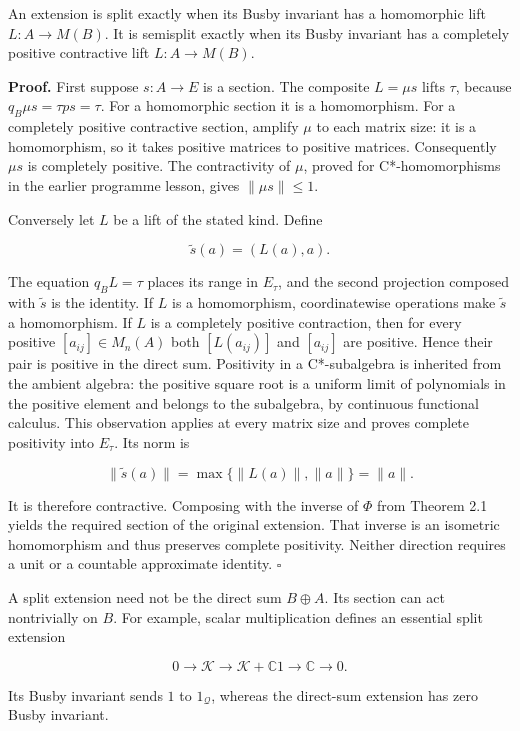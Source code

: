 \documentclass[
  11pt,
]{article}
\begin{document}
An extension is split exactly when its Busby invariant has a homomorphic
lift \(L:A\to M(B)\). It is semisplit exactly when its Busby invariant
has a completely positive contractive lift \(L:A\to M(B)\).

\textbf{Proof.} First suppose \(s:A\to E\) is a section. The composite
\(L=\mu s\) lifts \(\tau\), because \(q_B\mu s=\tau ps=\tau\). For a
homomorphic section it is a homomorphism. For a completely positive
contractive section, amplify \(\mu\) to each matrix size: it is a
homomorphism, so it takes positive matrices to positive matrices.
Consequently \(\mu s\) is completely positive. The contractivity of
\(\mu\), proved for C*-homomorphisms in the earlier programme lesson,
gives \(\|\mu s\|\leq1\).

Conversely let \(L\) be a lift of the stated kind. Define

\[
\widetilde s(a)=(L(a),a).
\]

The equation \(q_BL=\tau\) places its range in \(E_\tau\), and the
second projection composed with \(\widetilde s\) is the identity. If
\(L\) is a homomorphism, coordinatewise operations make \(\widetilde s\)
a homomorphism. If \(L\) is a completely positive contraction, then for
every positive \([a_{ij}]\in M_n(A)\) both \([L(a_{ij})]\) and
\([a_{ij}]\) are positive. Hence their pair is positive in the direct
sum. Positivity in a C*-subalgebra is inherited from the ambient
algebra: the positive square root is a uniform limit of polynomials in
the positive element and belongs to the subalgebra, by continuous
functional calculus. This observation applies at every matrix size and
proves complete positivity into \(E_\tau\). Its norm is

\[
\|\widetilde s(a)\|=\max\{\|L(a)\|,\|a\|\}=\|a\|.
\]

It is therefore contractive. Composing with the inverse of \(\Phi\) from
Theorem 2.1 yields the required section of the original extension. That
inverse is an isometric homomorphism and thus preserves complete
positivity. Neither direction requires a unit or a countable approximate
identity. \(\square\)

A split extension need not be the direct sum \(B\oplus A\). Its section
can act nontrivially on \(B\). For example, scalar multiplication
defines an essential split extension

\[
0\longrightarrow\mathcal K\longrightarrow\mathcal K+\mathbb C1
\longrightarrow\mathbb C\longrightarrow0.
\]

Its Busby invariant sends \(1\) to \(1_{\mathcal Q}\), whereas the
direct-sum extension has zero Busby invariant.
\end{document}
